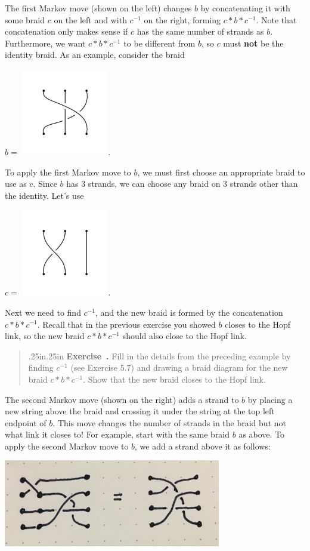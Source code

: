 \documentclass[12 pt]{article}
\newcounter{exercise}[section]
\newenvironment{exercise}{\refstepcounter{exercise}\par\bigskip \begin{quotation}{}{\leftmargin .25in\rightmargin .25in}
	\noindent \textbf{Exercise~\thesection.\theexercise }  \rmfamily}{\end{quotation}\par\bigskip}
\begin{document}
The first Markov move (shown  on the left) changes $b$ by concatenating it with some braid $c$ on the left and with $c^{-1}$ on the right, forming $c * b * c^{-1}$. Note that concatenation only makes sense if $c$ has the same number of strands as $b$. Furthermore, we want $c * b * c^{-1}$ to be different from $b$, so $c$ must \textbf{not} be the identity braid. As an example, consider the braid 
	\begin{center} 
		$b = $ \includegraphics*[height = 1.5in]{exercise_8_4}. 
	\end{center} 
To apply the first Markov move to $b$, we must first choose an appropriate braid to use as $c$. Since $b$ has 3 strands, we can choose any braid on 3 strands other than the identity.  Let's use 
	\begin{center} 
		$c =$ \includegraphics*[height = 1.5in]{exercise_4_c1}.
	\end{center} 
Next we need to find $c^{-1}$, and the new braid is formed by the concatenation $c * b * c^{-1}$. Recall that in the previous exercise you showed $b$ closes to the Hopf link, so the new braid $c * b * c^{-1}$ should also close to the Hopf link.

\begin{exercise}
	Fill in the details from the preceding example by finding $c^{-1}$ (see Exercise 5.7) and drawing a braid diagram for the new braid $c * b * c^{-1}$. Show that the new braid closes to the Hopf link.
\end{exercise}

The second Markov move (shown on the right) adds a strand to $b$ by placing a new string above the braid and crossing it under the string at the top left endpoint of $b$. This move changes the number of strands in the braid but not what link it closes to! For example, start with the same braid $b$ as above.  To apply the second Markov move to $b$, we add a strand above it as follows:
	\begin{center}
		\includegraphics*[height = 1.5in]{Markov_2_eg}
	\end{center}
\end{document}
